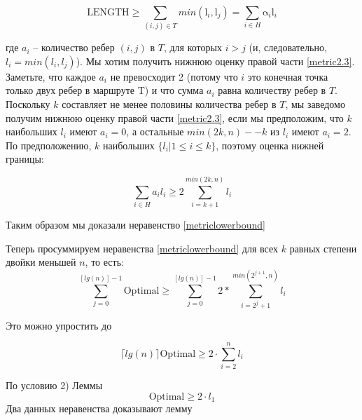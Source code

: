 \documentclass[a4paper, 14pt]{extarticle}
\numberwithin{equation}{section}
\begin{document}
\begin{equation}\label{metric2.3}
	{\mathrm{LENGTH}} \geqslant \sum_{(i,j)\in T}^{}min(\mathrm{l}_i,\mathrm{l}_j ) = \sum_{i\in H}^{} \mathrm{\alpha}_i\mathrm{l}_i
\end{equation}

где $a_i$ -- количество ребер $(i, j)$ в $T$, для которых $i > j$ (и, следовательно, $l_i=min(l_i, l_j)$).
Мы хотим получить нижнюю оценку правой части \eqref{metric2.3}. Заметьте, что каждое $a_i$ не превосходит 2 (потому что $i$ это конечная точка только двух ребер в маршруте T) и что сумма $a_i$ равна количеству ребер в $T$. Поскольку $k$ составляет не менее половины количества ребер в $T$, мы заведомо получим нижнюю оценку правой части \eqref{metric2.3}, если мы предположим, что $k$ наибольших $l_i$ имеют $a_i=0$, а остальные $min (2k, n) -- k$ из $l_i$ имеют $a_i= 2$. По предположению, $k$ наибольших $\{ l_i|1 \leqslant i \leqslant k\}$, поэтому оценка нижней границы:


\begin{equation}
	\sum_{i \in H} a_i l_i \geqslant 2 \sum_{i=k+1}^{min(2k, n)} l_i
	\label{sum}
\end{equation}

Таким образом мы доказали неравенство \eqref{metriclowerbound}

Теперь просуммируем неравенства \eqref{metriclowerbound} для всех $k$ равных степени двойки меньшей $n$, то есть:
\begin{equation}
\sum_{j=0}^{[lg(n)]-1} \mathrm{Optimal} \geqslant \sum_{j=0}^{[lg(n)]-1} 2* \sum_{i=2^j+1}^{min(2^{j+1}, n)} l_i
\end{equation}

Это можно упростить до

\begin{equation}
\lceil lg(n) \rceil \mathrm{Optimal} \geqslant 2\cdot \sum_{i=2}^{n} l_i
\end{equation}

По условию 2) Леммы
\begin{equation}
\mathrm{Optimal} \geqslant 2 \cdot l_1
\end{equation}
Два данных неравенства доказывают лемму
\end{document}
